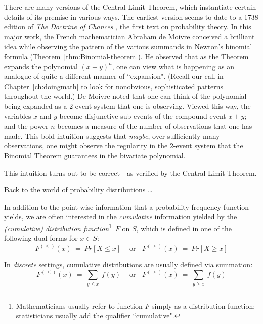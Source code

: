 There are many versions of the Central Limit Theorem, which instantiate certain details of its premise in various ways.  The earliest version seems to date to a 1738 edition of {\it The Doctrine of Chances} \cite{DeMoivre}, the first text on probability theory.  In this major work, the French mathematician Abraham de Moivre conceived a brilliant idea while observing the pattern of the various summands in Newton's binomial formula (Theorem~\ref{thm:Binomial-theorem}).  He observed that as the Theorem expands the polynomial $(x+y)^n$, one can view what is happening as an analogue of quite a different manner of ``expansion".  (Recall our call in Chapter~\ref{ch:doingmath} to look for nonobvious, sophisticated patterns throughout the world.)  De Moivre noted that one can think of the polynomial being expanded as a $2$-event system that one is observing.  Viewed this way, the variables $x$ and $y$ become disjunctive sub-events of the compound event $x+y$; and the power $n$ becomes a measure of the number of observations that one has made.  This bold intuition suggests that {\em maybe}, over sufficiently many observations, one might observe the regularity in the $2$-event system that the Binomial Theorem guarantees in the bivariate polynomial.

\smallskip

\noindent
This intuition turns out to be correct---as verified by the Central Limit Theorem.

\bigskip

\noindent Back to the world of probability distributions \ldots

\medskip

 

In addition to the point-wise information that a probability frequency function yields, we are
often interested in the {\em cumulative} information yielded by the {\it (cumulative) distribution function}\footnote{Mathematicians usually refer to function $F$ simply as a distribution function; statisticians usually add the qualifier ``cumulative".}~$F$ on $S$, which is defined in one of the following dual forms for $x \in S$:
\[ F^{(\leq)}(x) \ = \ Pr[X \leq x] \ \ \ \ \mbox{ or} \ \ \ \  F^{(\geq)}(x) \ = \ Pr[X \geq x]\]

\smallskip

In {\em discrete} settings, cumulative distributions are usually defined via summation:
\[ F^{(\leq)}(x) \ = \ \sum_{y \leq x} \ f(y)  \ \ \ \ \mbox{ or} \ \ \ \ F^{(\geq)}(x) \ = \ \sum_{y \geq x} \ f(y) \]

